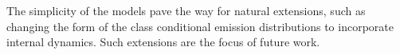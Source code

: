 \documentclass[letterpaper]{article}
\begin{document}
The simplicity of the models pave the way for natural extensions, such as changing the form of the class conditional emission distributions to incorporate internal dynamics. Such extensions are the focus of future work.




\end{document}
